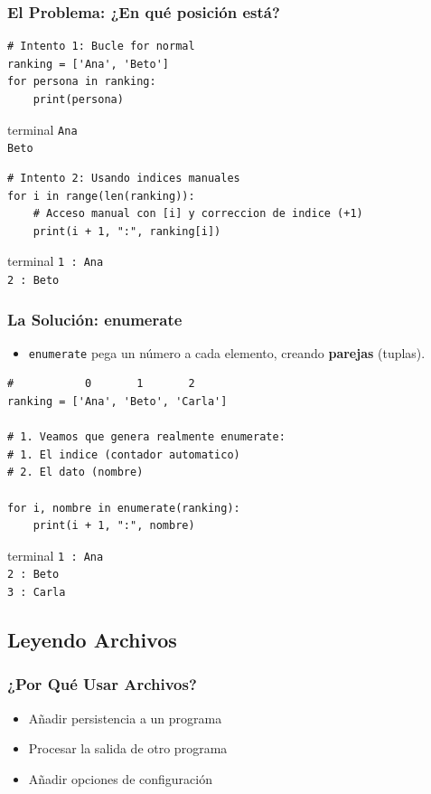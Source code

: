 \documentclass[11pt]{beamer}
\newcommand{\terminal}[1]{
    \vspace{-0.2em}
    \begin{beamercolorbox}[wd=\linewidth, sep=0.3em, rounded=false, shadow=false]{terminal}
    \texttt{#1}
    \end{beamercolorbox}
    \vspace{0.2em}
}
\begin{document}
\begin{frame}[fragile]\frametitle{El Problema: ¿En qué posición está?}
\begin{lstlisting}[basicstyle=\scriptsize]
# Intento 1: Bucle for normal
ranking = ['Ana', 'Beto']
for persona in ranking:
    print(persona)
\end{lstlisting}
\terminal{Ana\\Beto}
\begin{lstlisting}[basicstyle=\scriptsize]
# Intento 2: Usando indices manuales
for i in range(len(ranking)):
    # Acceso manual con [i] y correccion de indice (+1)
    print(i + 1, ":", ranking[i])
\end{lstlisting}
\terminal{1 : Ana\\2 : Beto}
\end{frame}

\begin{frame}[fragile]\frametitle{La Solución: enumerate}
\begin{itemize}
    \item \lstinline|enumerate| pega un número a cada elemento, creando \textbf{parejas} (tuplas).
\end{itemize}
\begin{lstlisting}[basicstyle=\scriptsize]
#           0       1       2
ranking = ['Ana', 'Beto', 'Carla']

# 1. Veamos que genera realmente enumerate:
# 1. El indice (contador automatico)
# 2. El dato (nombre)

for i, nombre in enumerate(ranking):
    print(i + 1, ":", nombre)
\end{lstlisting}
\terminal{1 : Ana\\2 : Beto\\3 : Carla}
\end{frame}

\subsection{Leyendo Archivos}

\begin{frame}\frametitle{¿Por Qué Usar Archivos?}
\begin{itemize}
\item Añadir persistencia a un programa
\item Procesar la salida de otro programa
\item Añadir opciones de configuración
\end{itemize}

\end{frame}
\end{document}
